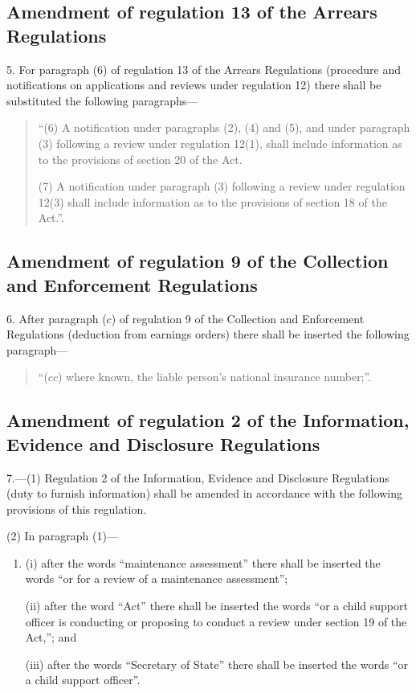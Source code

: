 \documentclass[a4paper]{article}
\begin{document}
\subsection[5. Amendment of regulation 13 of the Arrears Regulations]{Amendment of regulation 13 of the Arrears Regulations}

5.  For paragraph (6) of regulation 13 of the Arrears Regulations (procedure and notifications on applications and reviews under regulation 12) there shall be substituted the following paragraphs—
\begin{quotation}
“(6) A notification under paragraphs (2), (4) and (5), and under paragraph (3) following a review under regulation 12(1), shall include information as to the provisions of section 20 of the Act.

(7) A notification under paragraph (3) following a review under regulation 12(3) shall include information as to the provisions of section 18 of the Act.”.
\end{quotation}

\subsection[6. Amendment of regulation 9 of the Collection and Enforcement Regulations]{Amendment of regulation 9 of the Collection and Enforcement Regulations}

6.  After paragraph ($c$) of regulation 9 of the Collection and Enforcement Regulations (deduction from earnings orders) there shall be inserted the following paragraph—
\begin{quotation}
“($cc$) where known, the liable person’s national insurance number;”.
\end{quotation}

\subsection[7. Amendment of regulation 2 of the Information, Evidence and Disclosure Regulations]{Amendment of regulation 2 of the Information, Evidence and Disclosure Regulations}

7.—(1) Regulation 2 of the Information, Evidence and Disclosure Regulations (duty to furnish information) shall be amended in accordance with the following provisions of this regulation.

(2) In paragraph (1)—
\begin{enumerate}\item[]
(i) after the words “maintenance assessment” there shall be inserted the words “or for a review of a maintenance assessment”;

(ii) after the word “Act” there shall be inserted the words “or a child support officer is conducting or proposing to conduct a review under section 19 of the Act,”; and

(iii) after the words “Secretary of State” there shall be inserted the words “or a child support officer”.
\end{enumerate}
\end{document}
